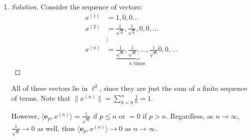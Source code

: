 \documentclass{article}
\begin{document}
\begin{enumerate}
\begin{proof}[Solution]
\[		\]
		Furthermore, both $\sum_n x_n^2$ and $\sum_n y_n^2$
		converge,
		so our limit laws tell us that their product must also converge,
		and $R_k$ is just the square of a convergent sequence,
		and so $R_k$ must also converge.
		Additionally, we proved in part (a) that $L_k$ converges.
		Thus, both of their $\limsup$s and $\liminf$s
		must equal each other, so we get
		\[
			\lim_{k\to\infty} L_k \leq \lim_{k\to\infty} R_k
		\]
		But extracting the definitions of $L_k$ and $R_k$,
		this is just
		\[
			\lim_{k\to\infty} \left\lvert\sum_{n=1}^k x_ny_n\right\rvert \leq
			\lim_{k\to\infty} \sqrt{\sum_{n=1}^k x^2_n}\sqrt{\sum_{n=1}^k y^2_n}
		\]
		\[
			\implies |\langle x,y \rangle| =
			\left\lvert\sum_{n=1}^\infty x_ny_n\right\rvert \leq
			\sqrt{\sum_{n=1}^\infty x^2_n}\sqrt{\sum_{n=1}^\infty y^2_n}
			= \lVert x \rVert \lVert y \rVert
		\]
	\end{proof}
	\item \begin{proof}[Solution]\let\qed\relax
		Consider the sequence of vectors:
		\begin{align*}
			x^{(1)} &= 1,0,0\dots\\
			x^{(2)} &= \frac{1}{\sqrt{2}}, \frac{1}{\sqrt{2}},0,0,\dots\\
					&\vdots\\
			x^{(n)} &= \underbrace{\frac{1}{\sqrt{n}}, \frac{1}{\sqrt{n}},
			\dots, \frac{1}{\sqrt{n}}}_{n \text{ times}}
			0,0,\dots
		\end{align*}
	\end{proof}
	All of these vectors lie in $\ell^2$,
	since they are just the sum of a finite sequence of terms.
	Note that $\lVert x^{(n)}\rVert = \sum_{k=0}^n \frac{1}{n} = 1$.

	However, $\langle \mathbf{e}_p, x^{(n)} \rangle = \frac{1}{\sqrt{n}}$
	if $p \leq n$ or $= 0$ if $p > n$.
	Regardless,
	as $n \to \infty$,
	$\frac{1}{\sqrt{n}} \to 0$ as well,
	thus $\langle \mathbf{e}_p, x^{(n)} \rangle \to 0$ as $n \to \infty$.
\end{enumerate}
\clearpage
\end{document}

